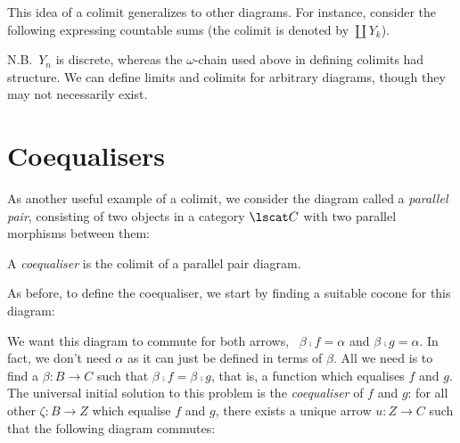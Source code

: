 This idea of a colimit generalizes to other diagrams. For instance, consider the
following expressing countable sums (the colimit is denoted by $\coprod Y_k$).
\begin{center}
\end{center}

N.B.~$Y_n$ is discrete, whereas the $\omega$-chain used above in defining
colimits had structure. We can define limits and colimits for arbitrary
diagrams, though they may not necessarily exist.

\section{Coequalisers}

As another useful example of a colimit, we consider the diagram called a \emph{parallel pair}, consisting of two objects in a category $\lscat C$ with two parallel morphisms between them:

\begin{center}
\end{center}

\begin{definition}[Coequaliser]
A \emph{coequaliser} is the colimit of a parallel pair diagram.
\end{definition}

As before, to define the coequaliser, we start by finding a suitable cocone for this diagram:

\begin{center}
\end{center}

We want this diagram to commute for both arrows, \ie\ $\beta \comp f = \alpha$ and $\beta \comp g = \alpha$. In fact, we don't need $\alpha$ as it can just be defined in terms of $\beta$. All we need is to find a $\beta : B \to C$ such that $\beta \comp f = \beta \comp g$, that is, a function which equalises $f$ and $g$. The universal initial solution to this problem is the \emph{coequaliser} of $f$ and $g$: for all other $\zeta : B \to Z$ which equalise $f$ and $g$, there exists a unique arrow $u : Z \to C$ such that the following diagram commutes:


